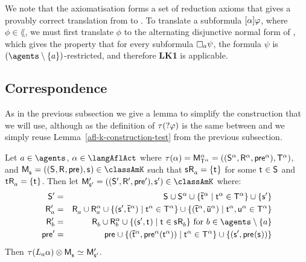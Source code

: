 We note that the axiomatisation \axiomAflKFF{} forms a set of reduction axioms that gives a provably correct translation from \langAfl{} to \lang{}.
To translate a subformula ${[ {\alpha} ]} \varphi$, where $\phi \in \lang$, we must first translate $\phi$ to the alternating disjunctive normal form of \cite{hales:2012}, which gives the property that for every subformula $\necessaryA \psi$, the formula $\psi$ is $(\agents \setminus \{\agentA\})$-restricted, and therefore {\bf LK1} is applicable.

\subsection{Correspondence}

As in the previous subsection we give a lemma to simplify the construction that we will use, although as the definition of $\tau(?{\varphi})$ is the same between \classK{} and \classKFF{} we simply reuse Lemma~\ref{afl-k-construction-test} from the previous subsection.

\begin{lemma}\label{afl-kff-construction-learning}
Let $\agentA \in \agents$, $\alpha \in \langAflAct$ where $\tau(\alpha) = \aPModel[\alpha]{\aStatesT[\alpha]} = \aPModelTuple[\alpha]{\aStatesT[\alpha]}$, and $\aPModel{\aStateS} = \aPModelTuple{\aStateS} \in \classAmK$ such that $\aStateS \aAccessibility{\agentA} = \{\aStateT\}$ for some $\aStateT \in \aStates$ and $\aStateT \aAccessibility{\agentA} = \{\aStateT\}$.
Then let $\aPModelP{\aStateSP} = \aPModelTupleP{\aStateSP} \in \classAmK$ where:
\begin{eqnarray*}
    \aStatesP &=& \aStates \cup \aStates[\alpha] \cup \{\aPStateT[\alpha] \mid \aStateT[\alpha] \in \aStatesT[\alpha]\} \cup \{\aStateSP\}\\
    \aAccessibilityP{\agentA} &=& \aAccessibility{\agentA} \cup \aAccessibility[\alpha]{\agentA} \cup \{(\aStateSP, \aPStateT[\alpha]) \mid \aStateT[\alpha] \in \aStatesT[\alpha]\} \cup \{(\aPStateT[\alpha], \aPStateU[\alpha]) \mid \aStateT[\alpha], \aStateU[\alpha] \in \aStatesT[\alpha]\}\\
    \aAccessibilityP{\agentB} &=& \aAccessibility{\agentB} \cup \aAccessibility[\alpha]{\agentB} \cup \{(\aStateSP, \aStateT) \mid \aStateT \in \aStateS \aAccessibility{\agentB}\} \text{ for } \agentB \in \agents \setminus \{\agentA\}\\
    \aPreconditionP &=& \aPrecondition \cup \{(\aPStateT[\alpha], \aPrecondition[\alpha](\aStateT[\alpha])) \mid \aStateT[\alpha] \in \aStatesT[\alpha]\} \cup \{(\aStateSP, \aPrecondition(\aStateS))\}
\end{eqnarray*}
Then $\tau(\learnsA \alpha) \exec \aPModel{\aStateS} \bisimilar \aPModelP{\aStateSP}$.
\end{lemma}

